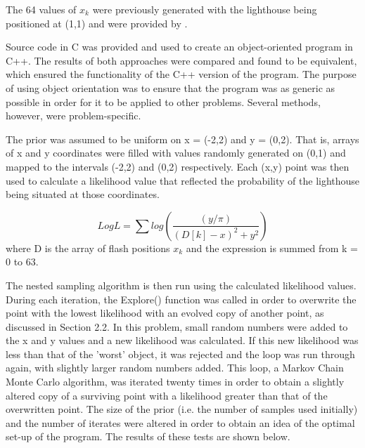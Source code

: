 \documentclass[a4paper,12pt]{article}
\begin{document}
The 64 values of $x_{k}$ were previously generated with the lighthouse being positioned at (1,1) and were provided by \cite{sivia}.

Source code in C was provided and used to create an object-oriented program in C++.  The results of both approaches were compared and found to be equivalent, which ensured the functionality of the C++ version of the program.  The purpose of using object orientation was to ensure that the program was as generic as possible in order for it to be applied to other problems.  Several methods, however, were problem-specific.
\newline
     
The prior was assumed to be uniform on x = (-2,2) and y = (0,2).  That is, arrays of x and y coordinates were filled with values randomly generated on (0,1) and mapped to the intervals (-2,2) and (0,2) respectively.  Each (x,y) point was then used to calculate a likelihood value that reflected the probability of the lighthouse being situated at those coordinates.
\newline

\begin{equation}
 LogL = \sum log(\frac{(y/\pi)}{(D[k]-x)^{2} + y^{2}})
\end{equation}
where D is the array of flash positions $x_{k}$ and the expression is summed from k = 0 to 63.


The nested sampling algorithm is then run using the calculated likelihood values.  During each iteration, the Explore() function was called in order to overwrite the point with the lowest likelihood with an evolved copy of another point, as discussed in Section 2.2.  In this problem, small random numbers were added to the x and y values and a new likelihood was calculated.  If this new likelihood was less than that of the 'worst' object, it was rejected and the loop was run through again, with slightly larger random numbers added.  This loop, a Markov Chain Monte Carlo algorithm, was iterated twenty times in order to obtain a slightly altered copy of a surviving point with a likelihood greater than that of the overwritten point. 
\newline
The size of the prior (i.e. the number of samples used initially) and the number of iterates were altered in order to obtain an idea of the optimal set-up of the program.  The results of these tests are shown below.

\end{document}
